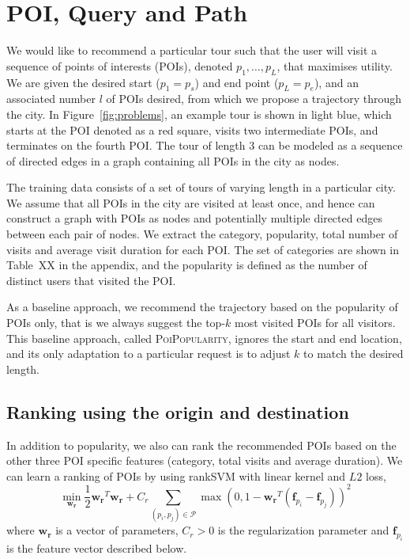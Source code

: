 \section{POI, Query and Path}
\label{method}

We would like to recommend a particular tour such that the user will visit a sequence of points of interests (POIs), denoted $p_1, \ldots, p_L$, that maximises utility. We are given the desired start ($p_1=p_s$) and end point ($p_L=p_e$), and an associated number $l$ of POIs desired, from which we propose a trajectory through the city. In Figure~\ref{fig:problems}, an example tour is shown in light blue, which starts at the POI denoted as a red square, visits two intermediate POIs, and terminates on the fourth POI. The tour of length 3 can be modeled as a sequence of directed edges in a graph containing all POIs in the city as nodes.

The training data consists of a set of tours of varying length in a particular city. We assume that all POIs in the city are visited at least once, and hence can construct a graph with POIs as nodes and potentially multiple directed edges between each pair of nodes. We extract the category, popularity, total number of visits and average visit duration for each POI. The set of categories are shown in Table~XX in the appendix, and the popularity is defined as the number of distinct users that visited the POI.

As a baseline approach, we recommend the trajectory based on the popularity of POIs only, that is we always suggest the top-$k$ most visited POIs for all visitors. This baseline approach, called \textsc{PoiPopularity}, ignores the start and end location, and its only adaptation to a particular request is to adjust $k$ to match the desired length.



\subsection{Ranking using the origin and destination}
\label{ranksvm}

In addition to popularity, we also can rank the recommended POIs based on the other three POI specific features (category, total visits and average duration).
We can learn a ranking of POIs by using rankSVM with linear kernel and $L2$ loss\cite{lranksvm},
\begin{displaymath}
\min_{\mathbf{w_r}} \frac{1}{2} \mathbf{w_r}^T \mathbf{w_r} +
                    C_r \sum_{(p_i, p_j) \in \mathcal{P}}
                    \max \left( 0, 1 - \mathbf{w_r}^T (\mathbf{f}_{p_i} - \mathbf{f}_{p_j}) \right)^2
\end{displaymath}
where $\mathbf{w_r}$ is a vector of parameters,
$C_r > 0$ is the regularization parameter and
$\mathbf{f}_{p_i}$ is the feature vector described below.

